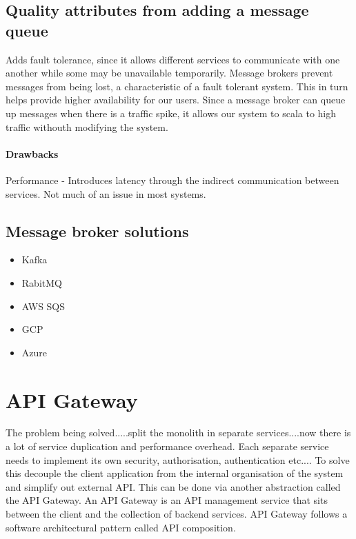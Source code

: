 \documentclass[a4paper, 11pt]{book}
\begin{document}
    \subsection{Quality attributes from adding a message queue}
    Adds fault tolerance, since it allows different services to communicate with one another while some may be unavailable temporarily.
    Message brokers prevent messages from being lost, a characteristic of a fault tolerant system.
    This in turn helps provide higher availability for our users.
    Since a message broker can queue up messages when there is a traffic spike, it allows our system to scala to high traffic withouth modifying the system.

    \paragraph{Drawbacks}
    Performance - Introduces latency through the indirect communication between services.
    Not much of an issue in most systems.

    \subsection{Message broker solutions}
    \begin{itemize}
        \item Kafka
        \item RabitMQ
        \item AWS SQS
        \item GCP
        \item Azure %
    \end{itemize}


    \section{API Gateway}
    The problem being solved.....split the monolith in separate services....now there is a lot of service duplication and performance overhead.
    Each separate service needs to implement its own security, authorisation, authentication etc....
    To solve this decouple the client application from the internal organisation of the system and simplify out external API.
    This can be done via another abstraction called the API Gateway.
    An API Gateway is an API management service that sits between the client and the collection of backend services.
    API Gateway follows a software architectural pattern called API composition.
\end{document}
